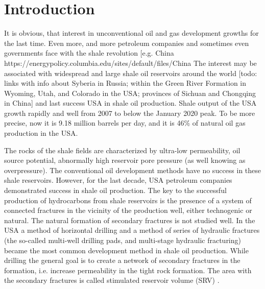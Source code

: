 \documentclass[article,authoryear,jpm]{beg_39}             %
\begin{document}


\maketitle




\section{Introduction}
\label{intro}
It is obvious, that interest in unconventional oil and gas development growths for the last time. Even more, and more petroleum companies and sometimes even governments face with the shale revolution [e.g. China https://energypolicy.columbia.edu/sites/default/files/China%
The interest may be associated with widespread and large shale oil reservoirs around the world [todo: links with info about Syberia in Russia; within the Green River Formation in Wyoming, Utah, and Colorado in the USA; provinces of Sichuan and Chongqing in China] and last success USA in shale oil production.
Shale output of the USA growth rapidly and well from 2007  to below the January 2020 peak.
To be more precise, now it is 9.18 million barrels per day, and it is 46\% of natural oil gas production in the USA.

The rocks of the shale fields are characterized by ultra-low permeability, oil source potential, abnormally high reservoir pore pressure (as well knowing as overpressure).
The conventional oil development methods have no success in these shale reservoirs.
However, for the last decade, USA petroleum companies demonstrated success in shale oil production. The key to the successful production of hydrocarbons from shale reservoirs is the presence of a system of connected fractures in the vicinity of the production well, either technogenic or natural.
The natural formation of secondary fractures is not studied well.
In the USA a method of horizontal drilling and a method of series of hydraulic fractures (the so-called multi-well drilling pads, and multi-stage hydraulic fracturing) became the most common development method in shale oil production.
While drilling the general goal is to create a network of secondary fractures in the formation, i.e. increase permeability in the tight rock formation.
The area with the secondary fractures is called stimulated reservoir volume (SRV) \cite{Warpinski, Wu, Barati, Ma2015}.
\end{document}

